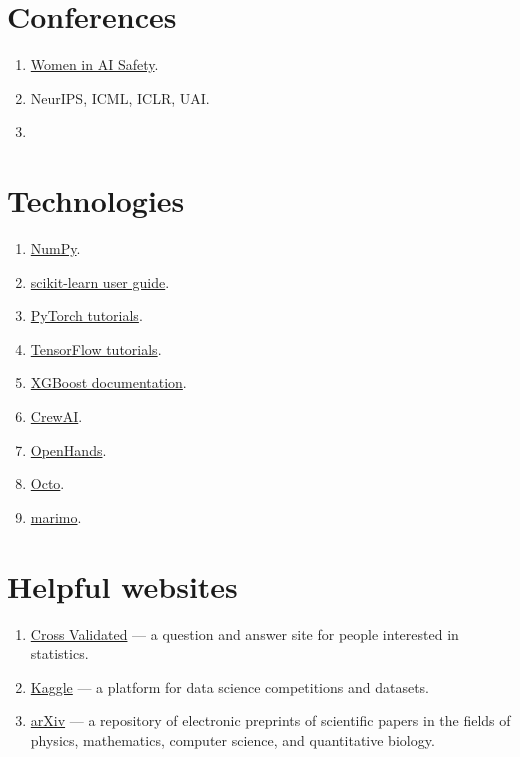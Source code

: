 \documentclass[a4paper, 12pt]{book}
\begin{document}
\section{Conferences}

\begin{enumerate}
    \item \href{https://womeninaisafety.toronto.acm.org/}{Women in AI Safety}.
    \item  NeurIPS, ICML, ICLR, UAI.
    \item 
\end{enumerate}

\section{Technologies}

\begin{enumerate}
    \item \href{https://numpy.org/doc/}{NumPy}.
    \item \href{https://scikit-learn.org/stable/user_guide.html}{scikit-learn user guide}.
    \item \href{https://pytorch.org/tutorials/}{PyTorch tutorials}.
    \item \href{https://www.tensorflow.org/tutorials}{TensorFlow tutorials}.
    \item \href{https://xgboost.readthedocs.io/}{XGBoost documentation}.
    \item \href{https://github.com/crewAIInc/crewAI}{CrewAI}.
    \item \href{https://github.com/OpenHands/OpenHands}{OpenHands}.
    \item \href{https://octo.axiomatic-ai.com/search}{Octo}.
    \item \href{https://marimo.io/}{marimo}.
\end{enumerate}

\section{Helpful websites}

\begin{enumerate}
    \item \href{https://stats.stackexchange.com/}{Cross Validated} --- a question and answer site for people interested in statistics.
    \item \href{https://www.kaggle.com/}{Kaggle} --- a platform for data science competitions and datasets.
    \item \href{https://arxiv.org/}{arXiv} --- a repository of electronic preprints of scientific papers in the fields of physics, mathematics, computer science, and quantitative biology.
\end{enumerate}

\backmatter
\printindex
\printbibliography
\end{document}
